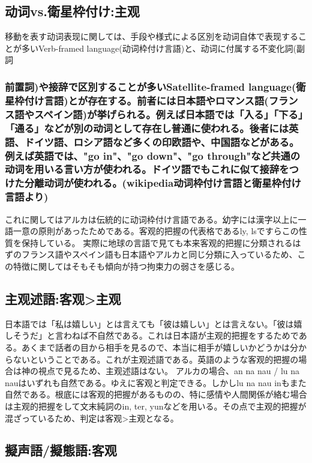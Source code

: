 \subsection{动词vs.衛星枠付け:主观}

移動を表す动词表现に関しては、手段や様式による区別を动词自体で表现することが多いVerb-framed language(动词枠付け言語)と、动词に付属する不変化詞(副詞\subsubsection{前置詞)や接辞で区別することが多いSatellite-framed language(衛星枠付け言語)とが存在する。前者には日本語やロマンス語(フランス語やスペイン語)が挙げられる。例えば日本語では「入る」「下る」「通る」などが別の动词として存在し普通に使われる。後者には英語、ドイツ語、ロシア語など多くの印欧語や、中国語などがある。例えば英語では、"go in"、"go down"、"go through"など共通の动词を用いる言い方が使われる。ドイツ語でもこれに似て接辞をつけた分離动词が使われる。(wikipedia动词枠付け言語と衛星枠付け言語より)}

これに関してはアルカは伝統的に动词枠付け言語である。幼字には漢字以上に一語一意の原則があったためである。客观的把握の代表格であるly, lsですらこの性質を保持している。
実際に地球の言語で見ても本来客观的把握に分類されるはずのフランス語やスペイン語も日本語やアルカと同じ分類に入っているため、この特徴に関してはそもそも傾向が持つ拘束力の弱さを感じる。

\subsection{主观述語:客观>主观}

日本語では「私は嬉しい」とは言えても「彼は嬉しい」とは言えない。「彼は嬉しそうだ」と言わねば不自然である。これは日本語が主观的把握をするためである。あくまで話者の目から相手を見るので、本当に相手が嬉しいかどうかは分からないということである。これが主观述語である。英語のような客观的把握の場合は神の視点で見るため、主观述語はない。
アルカの場合、an na nau / lu na nauはいずれも自然である。ゆえに客观と判定できる。しかしlu na nau inもまた自然である。根底には客观的把握があるものの、特に感情や人間関係が絡む場合は主观的把握をして文末純詞のin, ter, yunなどを用いる。その点で主观的把握が混ざっているため、判定は客观>主观となる。

\subsection{擬声語/擬態語:客观}

